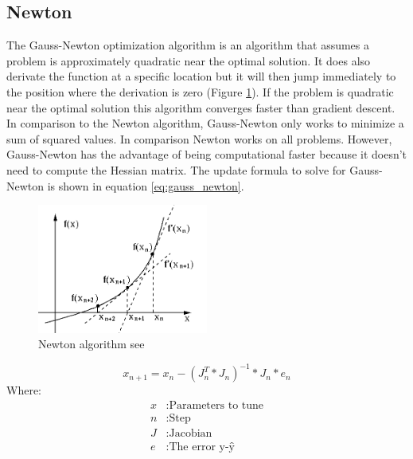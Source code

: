 \documentclass[11pt,a4paper,titlepage,oneside]{report}
\begin{document}
\subsection{Newton}
The Gauss-Newton optimization algorithm is an algorithm that assumes a problem is approximately quadratic near the optimal solution. It does also derivate the function at a specific location but it will then jump immediately to the position where the derivation is zero (Figure \ref{fig:newton}). If the problem is quadratic near the optimal solution this algorithm converges faster than gradient descent. In comparison to the Newton algorithm, Gauss-Newton only works to minimize a sum of squared values. In comparison Newton works on all problems. However, Gauss-Newton has the advantage of being computational faster \cite{gauss_newton} because it doesn't need to compute the Hessian matrix. The update formula to solve for Gauss-Newton is shown in equation \ref{eq:gauss_newton}.

\begin{figure}[H]
  \begin{center}
    \includegraphics[width=0.5\textwidth]{img/newton.png}
  \end{center}
  \caption{Newton algorithm see \cite{newton_image}}\label{fig:newton}
\end{figure}

\begin{equation}\label{eq:gauss_newton}
  x_{n+1} = x_n - (J_n^T*J_n)^{-1}*J_n*e_n
\end{equation}
Where:
\begin{align*}
  x		  &: \text{Parameters to tune}\\
  n		  &: \text{Step}\\
  J		  &: \text{Jacobian}\\
  e  	  &: \text{The error y-ŷ}
\end{align*}
\end{document}
